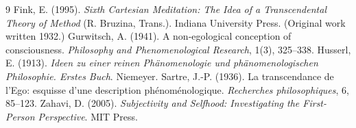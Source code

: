 \documentclass{situationist-preprint}
\begin{document}
\begin{thebibliography}{9}\small
{} Fink, E. (1995). \emph{Sixth Cartesian Meditation: The Idea of a Transcendental Theory of Method} (R. Bruzina, Trans.). Indiana University Press. (Original work written 1932.)
 Gurwitsch, A. (1941). A non-egological conception of consciousness. \emph{Philosophy and Phenomenological Research}, 1(3), 325--338.
 Husserl, E. (1913). \emph{Ideen zu einer reinen Phänomenologie und phänomenologischen Philosophie. Erstes Buch}. Niemeyer.
 Sartre, J.-P. (1936). La transcendance de l'Ego: esquisse d'une description phénoménologique. \emph{Recherches philosophiques}, 6, 85--123.
 Zahavi, D. (2005). \emph{Subjectivity and Selfhood: Investigating the First-Person Perspective}. MIT Press.
\end{thebibliography}
\end{document}
